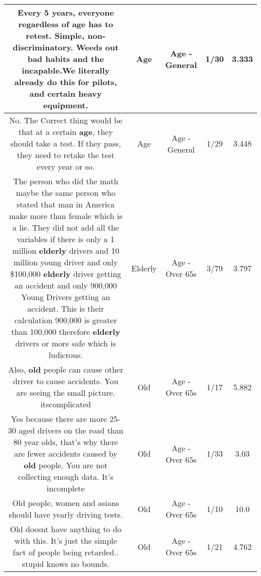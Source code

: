 \documentclass[11pt]{article}
\newlength\mylength
\begin{document}
\begin{center}
\begin{longtable}{|C{.65\mylength}|C{.30\mylength}|C{.12\mylength}|C{.12\mylength}|C{.12\mylength}|}
  \small Every 5 years, everyone regardless of \textbf{age} has to retest. Simple, non-discriminatory. Weeds out bad habits and the incapable.We literally already do this for pilots, and certain heavy equipment.\normalsize   & Age & Age - General & 1/30 & 3.333 \\  \hline
  \small No. The Correct thing would be that at a certain \textbf{age}, they should take a test. If they pass, they need to retake the test every year or so.\normalsize   & Age & Age - General & 1/29 & 3.448 \\  \hline
  \small The person who did the math maybe the same person who stated that man in America make more than female which is a lie. They did not add all the variables if there is only a 1 million \textbf{elderly} drivers and 10 million young driver and only \$100,000 \textbf{elderly} driver getting an accident and only 900,000 Young Drivers getting an accident. This is their calculation 900,000 is greater than 100,000 therefore \textbf{elderly} drivers or more safe which is ludicrous.\normalsize   & Elderly & Age - Over 65s & 3/79 & 3.797 \\  \hline
  \small Also, \textbf{old} people can cause other driver to cause accidents. You are seeing the small picture. itscomplicated\normalsize   & Old & Age - Over 65s & 1/17 & 5.882 \\  \hline
  \small Yes because there are more 25-30 aged drivers on the road than 80 year olds, that's why there are fewer accidents caused by \textbf{old} people. You are not collecting enough data. It's incomplete\normalsize   & Old & Age - Over 65s & 1/33 & 3.03 \\  \hline
  \small Old people, women and asians should have yearly driving tests.\normalsize   & Old & Age - Over 65s & 1/10 & 10.0 \\  \hline
  \small Old doesnt have anything to do with this.  It's just the simple fact of people being retarded.. stupid knows no bounds.\normalsize   & Old & Age - Over 65s & 1/21 & 4.762 \\  \hline

\end{longtable}
\end{center}
\end{document}
